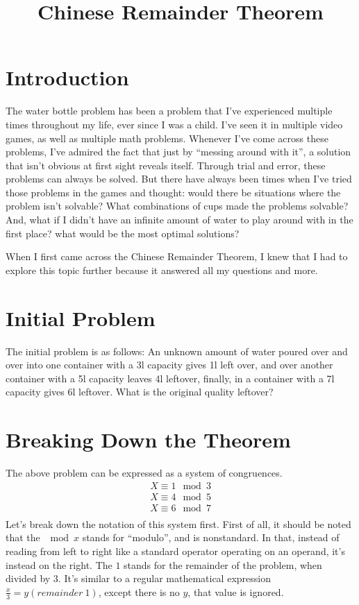 \documentclass[index]{subfiles}
\begin{document}
\title{Chinese Remainder Theorem}
\date{}
\author{}
\maketitle

\newpage

\tableofcontents
\thispagestyle{empty}
\newpage
\setcounter{page}{1}

\section{Introduction}

The water bottle problem has been a problem that I've experienced multiple times throughout my life, ever since I was a child. I've seen it in multiple video games, as well as multiple math problems. Whenever I've come across these problems, I've admired the fact that just by ``messing around with it'', a solution that isn't obvious at first sight reveals itself. Through trial and error, these problems can always be solved. But there have always been times when I've tried those problems in the games and thought: would there be situations where the problem isn't solvable? What combinations of cups made the problems solvable? And, what if I didn't have an infinite amount of water to play around with in the first place? what would be the most optimal solutions?

When I first came across the Chinese Remainder Theorem, I knew that I had to explore this topic further because it answered all my questions and more.

\section{Initial Problem}
The initial problem is as follows: An unknown amount of water poured over and over into one container with a 3l capacity gives 1l left over, and over another container with a 5l capacity leaves 4l leftover, finally, in a container with a 7l capacity gives 6l leftover. What is the original quality leftover?

\section{Breaking Down the Theorem}
The above problem can be expressed as a system of congruences.
\begin{align*}
    X\equiv 1\mod 3 \\
    X\equiv 4\mod 5 \\
    X\equiv 6\mod 7 \\
\end{align*}
Let's break down the notation of this system first. First of all, it should be noted that the \(\mod x\) stands for ``modulo'', and is nonstandard. In that, instead of reading from left to right like a standard operator operating on an operand, it's instead on the right. The \(1\) stands for the remainder of the problem, when divided by \(3\). It's similar to a regular mathematical expression \(\frac{x}{3}=y (remainder\ 1)\), except there is no \(y\), that value is ignored.
\end{document}
